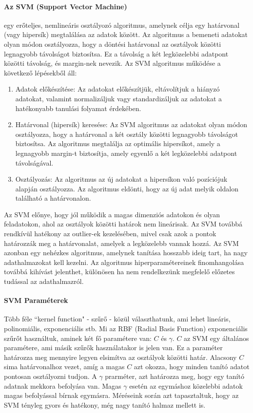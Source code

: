 \documentclass[12pt,a4paper]{article}
\begin{document}
\paragraph{Az SVM (Support Vector Machine)} egy erőteljes, nemlineáris osztályozó algoritmus, amelynek célja egy határvonal (vagy hipersík) megtalálása az adatok között. Az algoritmus a bemeneti adatokat olyan módon osztályozza, hogy a döntési határvonal az osztályok közötti legnagyobb távolságot biztosítsa. Ez a távolság a két legközelebbi adatpont közötti távolság, és margin-nek nevezik.
Az SVM algoritmus működése a következő lépésekből áll:
\begin{enumerate}
    \item Adatok előkészítése: Az adatokat előkészítjük, eltávolítjuk a hiányzó adatokat, valamint normalizáljuk vagy standardizáljuk az adatokat a hatékonyabb tanulási folyamat érdekében.
    \item Határvonal (hipersík) keresése: Az SVM algoritmus az adatokat olyan módon osztályozza, hogy a határvonal a két osztály közötti legnagyobb távolságot biztosítsa. Az algoritmus megtalálja az optimális hipersíkot, amely a legnagyobb margin-t biztosítja, amely egyenlő a két legközelebbi adatpont távolságával.
    \item Osztályozás: Az algoritmus az új adatokat a hipersíkon való pozíciójuk alapján osztályozza. Az algoritmus eldönti, hogy az új adat melyik oldalon található a határvonalon.
\end{enumerate}
Az SVM előnye, hogy jól működik a magas dimenziós adatokon és olyan feladatokon, ahol az osztályok közötti határok nem lineárisak. Az SVM továbbá rendkívül hatékony az outlier-ek kezelésében, mivel csak azok a pontok határozzák meg a határvonalat, amelyek a legközelebb vannak hozzá. Az SVM azonban egy nehézkes algoritmus, amelynek tanítása hosszabb ideig tart, ha nagy adathalmazokat kell kezelni. Az algoritmus hiperparamétereinek finomhangolása továbbá kihívást jelenthet, különösen ha nem rendelkezünk megfelelő előzetes tudással az adathalmazról.
\paragraph{SVM Paraméterek} Több féle ``kernel function" - szűrő - közül választhatunk, ami lehet lineáris, polinomiális, exponenciális stb. Mi az RBF (Radial Basis Function) exponenciális szűrőt használtuk, aminek két fő paramétere van: $C$ és $\gamma$. $C$ az SVM egy általános paramétere, ami másik szűrők használatakor is jelen van. Ez a paraméter határozza meg mennyire legyen elsimítva az osztályok közötti határ. Alacsony $C$ sima határvonalhoz vezet, amíg a magas $C$ azt okozza, hogy minden tanító adatot pontosan osztályozni tudjon. A $\gamma$ prarméter, azt határozza meg, hogy egy tanító adatnak mekkora befolyása van. Magas $\gamma$ esetén az egymáshoz közelebbi adatok magas befolyással bírnak egymásra. Méréseink során azt tapasztaltuk, hogy az SVM tényleg gyors és hatékony, még nagy tanító halmaz mellett is.
\end{document}
